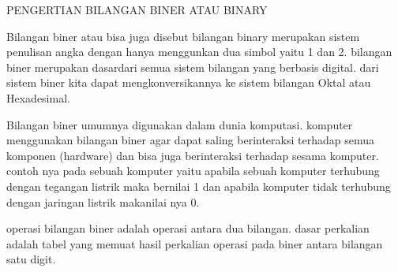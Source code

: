 PENGERTIAN BILANGAN BINER ATAU BINARY

Bilangan biner atau bisa juga disebut bilangan binary merupakan sistem penulisan angka dengan hanya menggunkan dua simbol 
yaitu 1 dan 2. bilangan biner merupakan dasardari semua sistem bilangan yang berbasis digital. dari sistem biner kita dapat 
mengkonversikannya ke sistem bilangan Oktal atau Hexadesimal.

Bilangan biner umumnya digunakan dalam dunia komputasi. komputer menggunakan bilangan biner agar dapat saling berinteraksi 
terhadap semua komponen (hardware) dan bisa juga berinteraksi terhadap sesama komputer. contoh nya pada sebuah komputer yaitu 
apabila sebuah komputer terhubung dengan tegangan listrik maka bernilai 1 dan apabila komputer tidak terhubung dengan jaringan 
listrik makanilai nya 0.

operasi bilangan biner  adalah operasi antara dua bilangan. dasar perkalian adalah tabel yang memuat hasil perkalian operasi 
pada biner antara bilangan satu digit.
